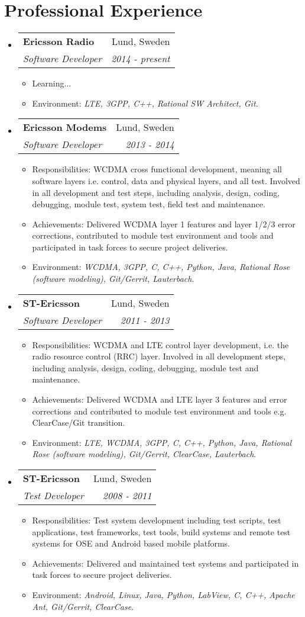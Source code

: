 \documentclass[letterpaper,11pt]{article}
\makeatletter
\newcommand{\resitem}[1]{\item #1 \vspace{-2pt}}
\newcommand{\ressubheading}[4]{
\begin{tabular*}{6.5in}{l@{\cftdotfill{\cftsecdotsep}\extracolsep{\fill}}r}
		\textbf{#1} & #2 \\
		\textit{#3} & \textit{#4} \\
\end{tabular*}\vspace{-6pt}}
\makeatother
\begin{document}
\section*{Professional Experience}
\begin{itemize}

\item \ressubheading{Ericsson Radio}{Lund, Sweden}{Software Developer}{2014 - present}
\begin{itemize}
	\resitem{Learning...}
	\resitem{Environment: \textit{LTE, 3GPP, C++, Rational SW Architect, Git.}}
\end{itemize}

\item \ressubheading{Ericsson Modems}{Lund, Sweden}{Software Developer}{2013 - 2014}
\begin{itemize}
	\resitem{Responsibilities: WCDMA cross functional development, meaning all software layers i.e. control, data and physical layers, and all test. Involved in all development and test steps, including analysis, design, coding, debugging, module test, system test, field test and maintenance.}
	\resitem{Achievements: Delivered WCDMA layer 1 features and layer 1/2/3 error corrections, contributed to module test environment and tools and participated in task forces to secure project deliveries.}
	\resitem{Environment: \textit{WCDMA, 3GPP, C, C++, Python, Java, Rational Rose (software modeling), Git/Gerrit, Lauterbach}.}
\end{itemize}

\item \ressubheading{ST-Ericsson}{Lund, Sweden}{Software Developer}{2011 - 2013}
\begin{itemize}
	\resitem{Responsibilities: WCDMA and LTE control layer development, i.e. the radio resource control (RRC) layer. Involved in all development steps, including analysis, design, coding, debugging, module test and maintenance.}
	\resitem{Achievements: Delivered WCDMA and LTE layer 3 features and error corrections and contributed to module test environment and tools e.g. ClearCase/Git transition.}
	\resitem{Environment: \textit{LTE, WCDMA, 3GPP, C, C++, Python, Java, Rational Rose (software modeling), Git/Gerrit, ClearCase, Lauterbach}.}
\end{itemize}

\item \ressubheading{ST-Ericsson}{Lund, Sweden}{Test Developer}{2008 - 2011}
\begin{itemize}
	\resitem{Responsibilities: Test system development including test scripts, test applications, test frameworks, test tools, build systems and remote test systems for OSE and Android based mobile platforms.}
	\resitem{Achievements: Delivered and maintained test systems and participated in task forces to secure project deliveries.}
	\resitem{Environment: \textit{Android, Linux, Java, Python, LabView, C, C++, Apache Ant, Git/Gerrit, ClearCase}.}
\end{itemize}


\end{itemize}
\end{document}
